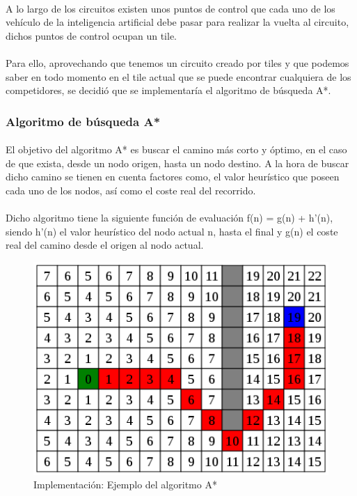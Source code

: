 \paragraph{}
A lo largo de los circuitos existen unos puntos de control que cada uno de los vehículo de la inteligencia artificial
debe pasar para realizar la vuelta al circuito, dichos puntos de control ocupan un tile.

\paragraph{}
Para ello, aprovechando que tenemos un circuito creado por tiles y que podemos
saber en todo momento en el tile actual
que se puede encontrar cualquiera de los competidores, se decidió que se implementaría el algoritmo de búsqueda A*.

\subsubsection{Algoritmo de búsqueda A*}

\paragraph{}
El objetivo del algoritmo A* es buscar el camino más corto y óptimo, en el caso de que exista, desde un nodo origen, hasta un
nodo destino. A la hora de buscar dicho camino se tienen en cuenta factores como, el valor heurístico que poseen cada uno
de los nodos, así como el coste real del recorrido.

\paragraph{}
Dicho algoritmo tiene la siguiente función de evaluación f(n) = g(n) + h'(n), siendo h'(n) el valor heurístico del nodo actual n,
hasta el final y g(n) el coste real del camino desde el origen al nodo actual.

\begin{figure}[H]
  \label{a_star}
  \begin{center}
    \includegraphics[scale=0.6]{imagenes/a_star.png}
  \end{center}
  \caption{Implementación: Ejemplo del algoritmo A*}
\end{figure}

